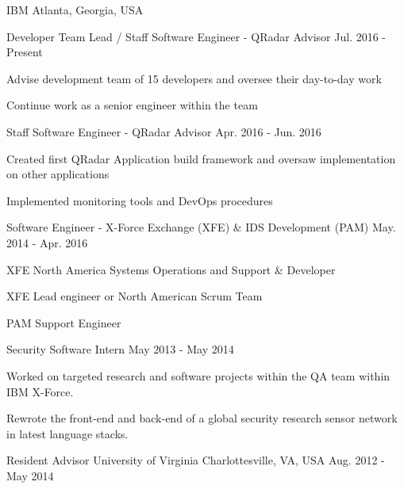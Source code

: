 \begin{cventries}
  \cvmultientry
    {IBM}
    {Atlanta, Georgia, USA}
    {
      \begin{cvsubentries}
        \cvsubentry
          {Developer Team Lead / Staff Software Engineer - QRadar Advisor}
          {Jul. 2016 - Present}
          {
          \begin{cvitems}
            \item {Advise development team of 15 developers and oversee their day-to-day work}
            \item {Continue work as a senior engineer within the team}
          \end{cvitems}
          }
          \cvsubentry
          {Staff Software Engineer - QRadar Advisor}
          {Apr. 2016 - Jun. 2016}
          {
          \begin{cvitems}
            \item {Created first QRadar Application build framework and oversaw implementation on other applications}
            \item {Implemented monitoring tools and DevOps procedures}
          \end{cvitems}
          }
          \cvsubentry
          {Software Engineer - X-Force Exchange (XFE) \& IDS Development (PAM)}
          {May. 2014 - Apr. 2016}
          {
          \begin{cvitems}
            \item {XFE North America Systems Operations and Support \& Developer}
            \item {XFE Lead engineer or North American Scrum Team}
            \item {PAM Support Engineer}
          \end{cvitems}
          }
          \cvsubentry
          {Security Software Intern}
          {May 2013 - May 2014}
          {
          \begin{cvitems}
            \item {Worked on targeted research and software projects within the QA team within IBM X-Force.}
            \item {Rewrote the front-end and back-end of a global security research sensor network in latest language stacks.}
          \end{cvitems}
          }
      \end{cvsubentries}
    }
  \cventry
    {Resident Advisor}
    {University of Virginia}
    {Charlottesville, VA, USA}
    {Aug. 2012 - May 2014}

\end{cventries}
